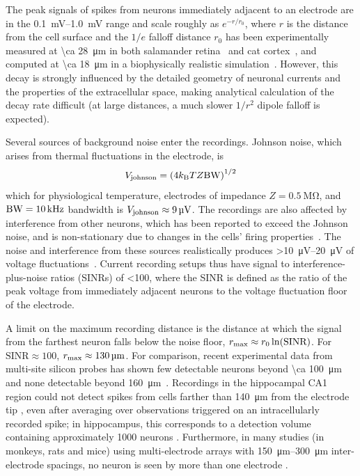 The peak signals of spikes from neurons immediately adjacent to an electrode are in the \SIrange{0.1}{1.0}{\milli\volt} range and scale roughly as $e^{-r/r_0}$, where $r$ is the distance from the cell surface and the $1/e$ falloff distance $r_0$ has been experimentally measured at \SI{\ca 28}{\micro\meter} in both salamander retina~\cite{segev04} and cat cortex~\cite{gray95}, and computed at \SI{\ca 18}{\micro\meter} in a biophysically realistic simulation~\cite{gold07}.
However, this decay is strongly influenced by the detailed geometry of neuronal currents and the properties of the extracellular space, making analytical calculation of the decay rate difficult (at large distances, a much slower $1/r^2$ dipole falloff is expected).

Several sources of background noise enter the recordings.
Johnson noise, which arises from thermal fluctuations in the electrode, is \[V_{\text{\scriptsize johnson}} = \left(4k_{\text{\scriptsize B}} T Z \text{BW}\right)^{1/2}\]
which for physiological temperature, electrodes of impedance $Z = \SI{0.5}{\mega\ohm}$, and $\text{BW} = \SI{10}{\kilo\hertz}$ bandwidth is $V_{\text{\scriptsize johnson}} \approx \SI{9}{\micro\volt}$.
The recordings are also affected by interference from other neurons, which has been reported to exceed the Johnson noise, and is non-stationary due to changes in the cells' firing properties~\cite{sahani99}. 
The noise and interference from these sources realistically produces \SIrange{>10}{20}{\micro\volt} of voltage fluctuations~\cite{camunas13}.
Current recording setups thus have signal to interference-plus-noise ratios (SINRs) of \num{<100}, where the SINR is defined as the ratio of the peak voltage from immediately adjacent neurons to the voltage fluctuation floor of the electrode.

A limit on the maximum recording distance is the distance at which the signal from the farthest neuron falls below the noise floor, $r_{\text{\scriptsize max}} \approx r_{\text{\scriptsize 0}}\ln(\text{SINR})$. For $\text{SINR} \approx 100$, $r_{\text{\scriptsize max}} \approx \SI{130}{\micro\meter}$. For comparison, recent experimental data from multi-site silicon probes has shown few detectable neurons beyond \SI{\ca 100}{\micro\meter} and none detectable beyond \SI{160}{\micro\meter}~\cite{du11}. 
Recordings in the hippocampal CA1 region could not detect spikes from cells farther than \SI{140}{\micro\meter} from the electrode tip \cite{Henze2000}, even after averaging over observations triggered on an intracellularly recorded spike; in hippocampus, this corresponds to a detection volume containing approximately 1000 neurons \cite{Buzaki2004}. Furthermore, in many studies (in monkeys, rats and mice) using multi-electrode arrays with \SIrange{150}{300}{\micro\meter} inter-electrode spacings, no neuron is seen by more than one electrode \cite{Wessberg2000, Carmena2003, Koralek2012, Jin2010}.

